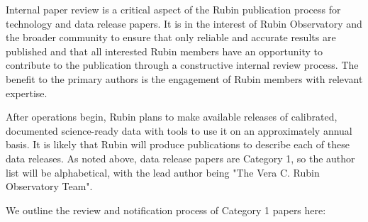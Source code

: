 Internal paper review is a critical aspect of the Rubin publication process for technology and data release papers.
It is in the interest of Rubin Observatory and the broader community to ensure that only reliable and accurate results are published and that all interested Rubin members have an opportunity to contribute to the publication through a constructive internal review process.
The benefit to the primary authors is the engagement of Rubin members with relevant expertise.

After operations begin, Rubin plans to make available releases of calibrated, documented science-ready data with tools to use it on an approximately annual basis.
It is likely that Rubin will produce publications to describe each of these data releases.
As noted above, data release papers are Category 1, so the author list will be alphabetical, with the lead author being "The Vera C. Rubin Observatory Team".

We outline the review and notification process of Category 1 papers here:

